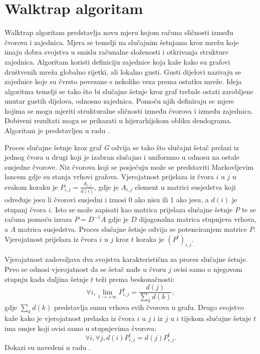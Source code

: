 \section{Walktrap algoritam}
Walktrap algoritam predstavlja novu mjeru kojom računa sličnosti između čvorova i zajednica. Mjera se temelji na slučajnim šetnjama kroz mrežu koje imaju dobra svojstva u smislu računalne složenosti i otkrivanja strukture zajednica. Algoritam koristi definiciju zajednice koja kaže kako su grafovi društvenih mreža globalno rijetki, ali lokalno gusti. Gusti dijelovi nazivaju se zajednice koje su čvrsto povezane s nekoliko veza prema ostatku mreže. Ideja algoritma temelji se tako što bi slučajne šetnje kroz graf trebale ostati zarobljene unutar gustih dijelova, odnosno zajednica. Pomoću njih definiraju se mjere kojima se mogu mjeriti strukturalne sličnosti između čvorova i između zajednica. Dobiveni rezultati mogu se prikazati u hijerarhijskom obliku dendograma. Algoritam je predstavljen u radu \cite{pons2005computing}.

Proces slučajne šetnje kroz graf \textit{G} odvija se tako što slučajni šetač prelazi iz jednog čvora u drugi koji je izabran slučajno i uniformno u odnosu na ostale susjedne čvorove. Niz čvorova koji se posjećuju može se predstaviti Markovljevim lancem gdje su stanja vrhovi grafova. Vjerojatnost prijelaza iz čvora $i$ u $j$ u svakom koraku je $ P_{i,j} = \frac{A_{i,j}}{d(i)} $, gdje je $A_{i,j}$ element u matrici susjedstva koji određuje jesu li čvorovi susjedni i iznosi 0 ako nisu ili 1 ako jesu, a $d(i)$ je stupanj čvora $i$. Isto se može zapisati kao matrica prijelaza slučajne šetnje $P$ te se računa pomoću izraza $P = D^{-1}A$ gdje je $D$ dijagonalna matrica stupnjeva vrhova, a $A$ matrica susjedstva. Proces slučajne šetnje odvija se potenciranjem matrice $P$. Vjerojatnost prijelaza iz čvora $i$ u $j$ kroz $t$ koraka je $(P^{t})_{i,j}$. 

Vjerojatnost zadovoljava dva svojstva karakteristična za proces slučajne šetnje. Prvo se odnosi vjerojatnost da se šetač nađe u čvoru $j$ ovisi samo o njegovom stupnju kada duljina šetnje $t$ teži prema beskonačnosti:
\begin{equation} \label{svojstvo1}
	\forall i, \lim_{t\to+\infty} P_{i,j}^{t} = \frac{d(j)}{\sum_{k}d(k)},
\end{equation}
gdje $\sum_{k}d(k)$ predstavlja sumu vrhova svih čvorova u grafu.
Drugo svojstvo kaže kako je vjerojatnost prelaska iz čvora $i$ u $j$ i iz $j$ u $i$ tijekom slučajne šetnje $t$ ima omjer koji ovisi samo u stupnjevima čvorova: 
\begin{equation} \label{svojstvo2}
	\forall i, \forall j, d(i) P_{i,j}^{t} = d(j) P_{i,j}^{t}.
\end{equation}
Dokazi su navedeni u radu \cite{pons2005computing}.

